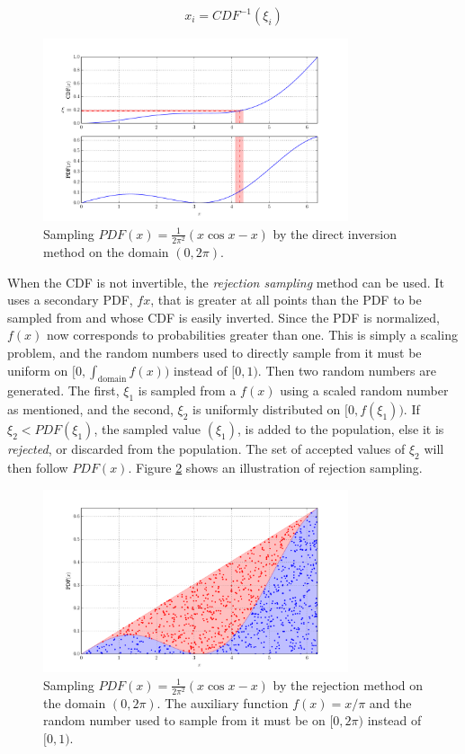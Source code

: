 \begin{equation}
\label{CDF_inversion}
 x_i = CDF^{-1}(\xi_i)
\end{equation}

\begin{figure}[h!] 
  \centering
    \includegraphics[width=0.8\textwidth]{graphics/direct_samp.pdf}
     \caption{Sampling $PDF(x)=\frac{1}{2\pi^2}(x \cos x - x)$ by the direct inversion method on the domain $(0,2\pi)$. \label{direct_samp}}
\end{figure}

When the CDF is not invertible, the \emph{rejection sampling} method can be used.  It uses a secondary PDF, $f{x}$, that is greater at all points than the PDF to be sampled from and whose CDF is easily inverted.  Since the PDF is normalized, $f(x)$ now corresponds to probabilities greater than one.  This is simply a scaling problem, and the random numbers used to directly sample from it must be uniform on $[0,\int_\mathrm{domain}f(x))$ instead of $[0,1)$.   Then two random numbers are generated.  The first, $\xi_1$ is sampled from a $f(x)$ using a scaled random number as mentioned, and the second, $\xi_2$ is uniformly distributed on $[0,f(\xi_1))$.  If $\xi_2 < PDF(\xi_1)$, the sampled value $(\xi_1)$, is added to the population, else it is \emph{rejected}, or discarded from the population.  The set of accepted values of ${\xi_2}$ will then follow $PDF(x)$.  Figure \ref{rejection_samp} shows an illustration of rejection sampling.

\begin{figure}[h!] 
  \centering
    \includegraphics[width=0.8\textwidth]{graphics/rejection_samp.pdf}
     \caption{Sampling $PDF(x)=\frac{1}{2\pi^2}(x \cos x - x)$ by the rejection method on the domain $(0,2\pi)$.  The auxiliary function $f(x)=x/\pi$ and the random number used to sample from it must be on $[0,2\pi)$ instead of $[0,1)$. \label{rejection_samp}}
\end{figure}

